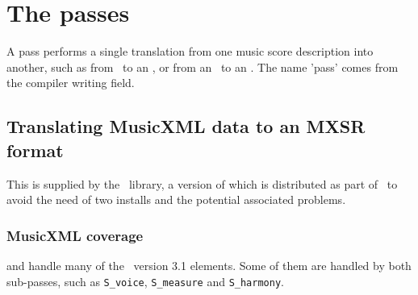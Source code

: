 



\chapter{The passes}

A pass performs a single translation from one music score description into another, such as from \mxml\ to an \mxsrRepr, or from an \mxsrRepr\ to an \msrRepr. The name 'pass' comes from the compiler writing field.


\section{Translating MusicXML data to an MXSR format}

This is supplied by the \libmusicxml\ library, a version of which is distributed as part of \mf\ to avoid the need of two installs and the potential associated problems.


\subsection{MusicXML coverage}\label{MusicXML coverage}

 and  handle many of the \mxml\ version 3.1 elements. Some of them are handled by both sub-passes, such as {\tt S_voice}, {\tt S_measure} and {\tt S_harmony}.

